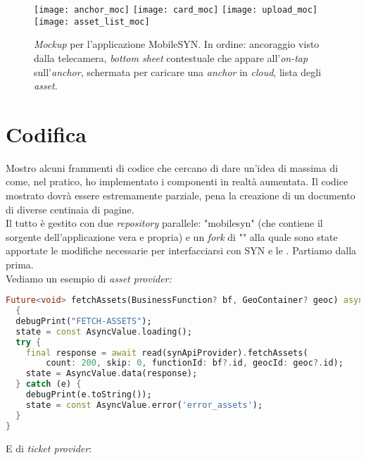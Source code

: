 \begin{figure}[H]
  \centering
  \texttt{[image: anchor\_moc]}\hfill
  \texttt{[image: card\_moc]}\hfill
  \texttt{[image: upload\_moc]}\hfill
  \texttt{[image: asset\_list\_moc]}
  \caption[\textit{App mockup} ]{\textit{Mockup} per l'applicazione MobileSYN. In ordine: ancoraggio visto dalla telecamera, \textit{bottom sheet} contestuale che appare all'\textit{on-tap} sull'\textit{anchor}, schermata per caricare una \textit{anchor} in \textit{cloud}, lista degli \textit{asset}.}
\end{figure}

\section{Codifica}
Mostro alcuni frammenti di codice che cercano di dare un'idea di massima di come, nel pratico, ho implementato i componenti in realtà aumentata. Il codice mostrato dovrà essere estremamente parziale, pena la creazione di un documento di diverse centinaia di pagine.\\
Il tutto è gestito con due \textit{repository} parallele: "mobilesyn" (che contiene il sorgente dell'applicazione vera e propria) e un \textit{fork} di "\aplug{}" alla quale sono state apportate le modifiche necessarie per interfacciarsi con SYN e le \asa{}. Partiamo dalla prima.\\
Vediamo un esempio di \textit{asset provider:}

\begin{lstlisting}[language=dart, label={lst:mobilesyn_asset_provider},firstnumber=1,caption={mobilesyn \textit{asset provider}}]
Future<void> fetchAssets(BusinessFunction? bf, GeoContainer? geoc) async 
  {
  debugPrint("FETCH-ASSETS");
  state = const AsyncValue.loading();
  try {
    final response = await read(synApiProvider).fetchAssets(
        count: 200, skip: 0, functionId: bf?.id, geocId: geoc?.id);
    state = AsyncValue.data(response);
  } catch (e) {
    debugPrint(e.toString());
    state = const AsyncValue.error('error_assets');
  }
}
\end{lstlisting} 

E di \textit{ticket provider}:

